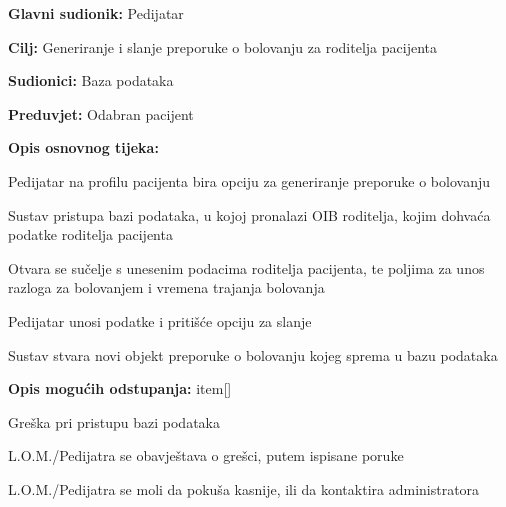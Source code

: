 					\noindent {}
					\begin{packed_item}
						
						\item \textbf{Glavni sudionik: }Pedijatar
						\item  \textbf{Cilj:} Generiranje i slanje preporuke o bolovanju za roditelja pacijenta
						\item  \textbf{Sudionici:} Baza podataka
						\item  \textbf{Preduvjet:} Odabran pacijent
						\item  \textbf{Opis osnovnog tijeka:}
						
						\item[] \begin{packed_enum}
							
							\item Pedijatar na profilu pacijenta bira opciju za generiranje preporuke o bolovanju
							\item Sustav pristupa bazi podataka, u kojoj pronalazi OIB roditelja, kojim dohvaća podatke roditelja pacijenta
							\item Otvara se sučelje s unesenim podacima roditelja pacijenta, te poljima za unos razloga za bolovanjem i vremena trajanja bolovanja
							\item Pedijatar unosi podatke i pritišće opciju za slanje
							\item Sustav stvara novi objekt preporuke o bolovanju kojeg sprema u bazu podataka
						\end{packed_enum}
						\item \textbf{Opis mogućih odstupanja:}
						item[] \begin{packed_item}
							\item[2/5.a] Greška pri pristupu bazi podataka
							\item[] \begin{packed_enum}
								
								\item L.O.M./Pedijatra se obavještava o grešci, putem ispisane poruke
								\item L.O.M./Pedijatra se moli da pokuša kasnije, ili da kontaktira administratora
								
							\end{packed_enum}
						\end{packed_item}
					\end{packed_item}
					
